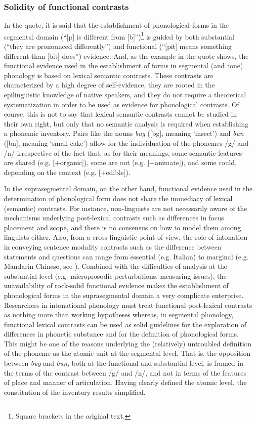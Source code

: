 \subsubsection{Solidity of functional contrasts}\label{sec2431}
In the quote, it is said that the establishment of phonological forms in the segmental domain (``[p] is different from [b]'')\footnote{Square brackets in the original text.} is guided by both substantial (``they are pronounced differently'') and functional (``[pit] means something different than [bit] does'') evidence. And, as the example in the quote shows, the functional evidence used in the establishment of forms in segmental (and tone) phonology is based on lexical semantic contrasts. These contrasts are characterized by a high degree of self-evidence, they are rooted in the epilinguistic knowledge of native speakers, and they do not require a theoretical systematization in order to be used as evidence for phonological contrasts. Of course, this is not to say that lexical semantic contrasts cannot be studied in their own right, but only that no semantic analysis is required when establishing a phonemic inventory. Pairs like the nouns \textit{bug} ([bg], meaning `insect') and \textit{bun} ([bn], meaning `small cake') allow for the individuation of the phonemes /g/ and /n/ irrespective of the fact that, as for their meanings, some semantic features are shared (e.g. [+organic]), some are not (e.g. [+animate]), and some could, depending on the context (e.g. [+edible]). 

In the suprasegmental domain, on the other hand, functional evidence used in the determination of phonological form does not share the immediacy of lexical (semantic) contrasts. For instance, non-linguists are not necessarily aware of the mechanisms underlying post-lexical contrasts such as differences in focus placement and scope, and there is no consensus on how to model them among linguists either. Also, from a cross-linguistic point of view, the role of intonation in conveying sentence modality contrasts such as the difference between statements and questions can range from essential (e.g. Italian) to marginal (e.g. Mandarin Chinese, see \citealt{zeng2004tones}). Combined with the difficulties of analysis at the substantial level (e.g. microprosodic perturbations, measuring issues), the unavailability of rock-solid functional evidence makes the establishment of phonological forms in the suprasegmental domain a very complicate enterprise. Researchers in intonational phonology must treat functional post-lexical contrasts as nothing more than working hypotheses whereas, in segmental phonology, functional lexical contrasts can be used as solid guidelines for the exploration of differences in phonetic substance and for the definition of phonological forms. This might be one of the reasons underlying the (relatively) untroubled definition of the phoneme as the atomic unit at the segmental level. That is, the opposition between \textit{bug} and \textit{bun}, both at the functional and substantial level, is framed in the terms of the contrast between /g/ and /n/, and not in terms of the features of place and manner of articulation. Having clearly defined the atomic level, the constitution of the inventory results simplified. 

